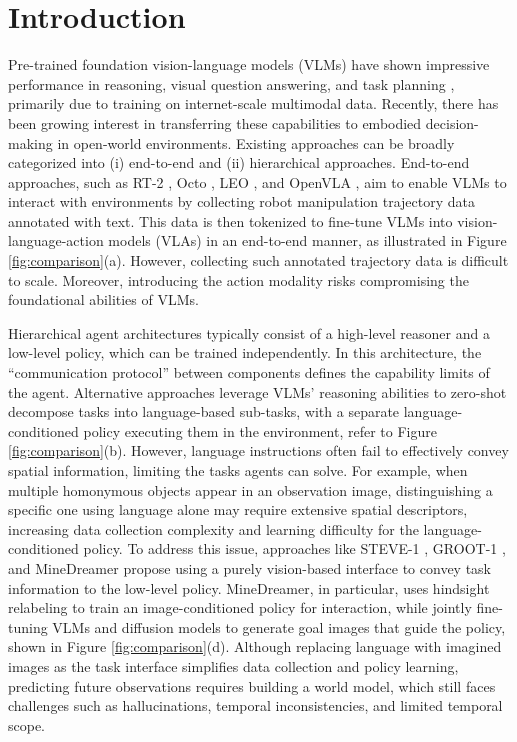 \documentclass[11pt, a4paper, logo, two column]{craftjarvis}
\begin{document}
\section{Introduction}
\label{sec:intro}

Pre-trained foundation vision-language models (VLMs) \citep{gemini, gpt4} have shown impressive performance in reasoning, visual question answering, and task planning \citep{rt-2,palm-e,deps,agentsurvey}, primarily due to training on internet-scale multimodal data. Recently, there has been growing interest in transferring these capabilities to embodied decision-making in open-world environments. Existing approaches can be broadly categorized into (i) end-to-end and (ii) hierarchical approaches. End-to-end approaches, such as RT-2 \citep{rt-2}, Octo \citep{octo}, LEO \citep{leo}, and OpenVLA \citep{openvlm}, aim to enable VLMs to interact with environments by collecting robot manipulation trajectory data annotated with text. This data is then tokenized to fine-tune VLMs into vision-language-action models (VLAs) in an end-to-end manner, as illustrated in Figure \ref{fig:comparison}(a). However, collecting such annotated trajectory data is difficult to scale. Moreover, introducing the action modality risks compromising the foundational abilities of VLMs. 

Hierarchical agent architectures typically consist of a high-level reasoner and a low-level policy, which can be trained independently. In this architecture, the ``communication protocol'' between components defines the capability limits of the agent. Alternative approaches \citep{deps, voyager, palm-e} leverage VLMs’ reasoning abilities to zero-shot decompose tasks into language-based sub-tasks, with a separate language-conditioned policy executing them in the environment, refer to Figure \ref{fig:comparison}(b). However, language instructions often fail to effectively convey spatial information, limiting the tasks agents can solve. For example, when multiple homonymous objects appear in an observation image, distinguishing a specific one using language alone may require extensive spatial descriptors, increasing data collection complexity and learning difficulty for the language-conditioned policy. 
To address this issue, approaches like STEVE-1 \citep{steve1}, GROOT-1 \citep{groot1}, and MineDreamer \citep{minedreamer} propose using a purely vision-based interface to convey task information to the low-level policy. MineDreamer, in particular, uses hindsight relabeling to train an image-conditioned policy \citep{steve1} for interaction, while jointly fine-tuning VLMs and diffusion models to generate goal images that guide the policy, shown in Figure \ref{fig:comparison}(d). Although replacing language with imagined images as the task interface simplifies data collection and policy learning, predicting future observations requires building a world model, which still faces challenges such as hallucinations, temporal inconsistencies, and limited temporal scope. 
\end{document}
